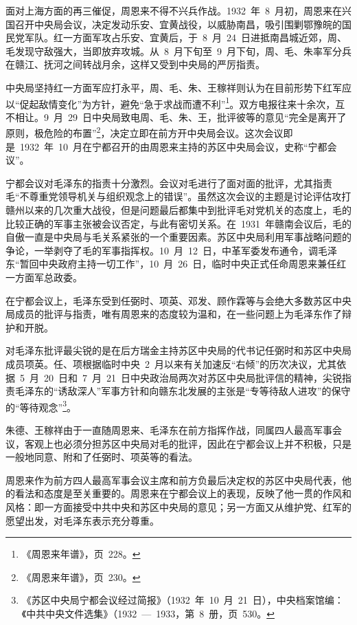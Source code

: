 面对上海方面的再三催促，周恩来不得不兴兵作战。1932~年~8~月初，周恩来在兴国召开中央局会议，决定发动乐安、宜黄战役，以威胁南昌，吸引围剿鄂豫皖的国民党军队。红一方面军攻占乐安、宜黄后，于~8~月~24~日进抵南昌城近郊，周、毛发现守敌强大，当即放弃攻城。从~8~月下旬至~9~月下旬，周、毛、朱率军分兵在赣江、抚河之间转战月余，这样又受到中央局的严厉指责。

中央局坚持红一方面军应打永平，周、毛、朱、王稼祥则认为在目前形势下红军应以“促起敌情变化”为方针，避免“急于求战而遭不利”\footnote{《周恩来年谱》，页~228。}。双方电报往来十余次，互不相让。9~月~29~日中央局致电周、毛、朱、王，批评彼等的意见“完全是离开了原则，极危险的布置”\footnote{《周恩来年谱》，页~230。}，决定立即在前方开中央局会议。这次会议即是~1932~年~10~月在宁都召开的由周恩来主持的苏区中央局会议，史称“宁都会议”。

宁都会议对毛泽东的指责十分激烈。会议对毛进行了面对面的批评，尤其指责毛“不尊重党领导机关与组织观念上的错误”。虽然这次会议的主题是讨论评估攻打赣州以来的几次重大战役，但是问题最后都集中到批评毛对党机关的态度上，毛的比较正确的军事主张被会议否定，与此有密切关系。在~1931~年赣南会议后，毛的自傲一直是中央局与毛关系紧张的一个重要因素。苏区中央局利用军事战略问题的争论，一举剥夺了毛的军事指挥权。10~月~12~日，中革军委发布通令，调毛泽东“暂回中央政府主持一切工作”，10~月~26~日，临时中央正式任命周恩来兼任红一方面军总政委。

在宁都会议上，毛泽东受到任弼时、项英、邓发、顾作霖等与会绝大多数苏区中央局成员的批评与指责，唯有周恩来的态度较为温和，在一些问题上为毛泽东作了辩护和开脱。

对毛泽东批评最尖锐的是在后方瑞金主持苏区中央局的代书记任弼时和苏区中央局成员项英。任、项根据临时中央~2~月以来有关加速反“右倾”的历次决议，尤其依据~5~月~20~日和~7~月~21~日中央政治局两次对苏区中央局批评信的精神，尖锐指责毛泽东的“诱敌深人”军事方针和向赣东北发展的主张是“专等待敌人进攻”的保守的“等待观念”\footnote{《苏区中央局宁都会议经过简报》（1932~年~10~月~21~日），中央档案馆编：《中共中央文件选集》（1932~—~1933，第~8~册，页~530。}。

朱德、王稼祥由于一直随周恩来、毛泽东在前方指挥作战，同属四人最高军事会议，客观上也必须分担苏区中央局对毛的批评，因此在宁都会议上并不积极，只是一般地同意、附和了任弼时、项英等的看法。

周恩来作为前方四人最高军事会议主席和前方负最后决定权的苏区中央局代表，他的看法和态度是至关重要的。周恩来在宁都会议上的表现，反映了他一贯的作风和风格：即一方面接受中共中央和苏区中央局的意见；另一方面又从维护党、红军的愿望出发，对毛泽东表示充分尊重。

